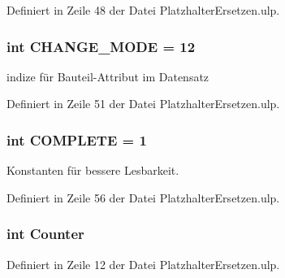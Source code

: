 Definiert in Zeile 48 der Datei Platzhalter\+Ersetzen.\+ulp.

\hypertarget{_platzhalter_ersetzen_8ulp_a3389481e9b966a29fb48e172a5942ddd}{}
\subsubsection[{C\+H\+A\+N\+G\+E\+\_\+\+M\+O\+D\+E}]{\setlength{\rightskip}{0pt plus 5cm}int C\+H\+A\+N\+G\+E\+\_\+\+M\+O\+D\+E = 12}\label{_platzhalter_ersetzen_8ulp_a3389481e9b966a29fb48e172a5942ddd}


indize für Bauteil-\/\+Attribut im Datensatz 



Definiert in Zeile 51 der Datei Platzhalter\+Ersetzen.\+ulp.

\hypertarget{_platzhalter_ersetzen_8ulp_a01030b244f6352425e8de676f9d43288}{}
\subsubsection[{C\+O\+M\+P\+L\+E\+T\+E}]{\setlength{\rightskip}{0pt plus 5cm}int C\+O\+M\+P\+L\+E\+T\+E = 1}\label{_platzhalter_ersetzen_8ulp_a01030b244f6352425e8de676f9d43288}


Konstanten für bessere Lesbarkeit. 



Definiert in Zeile 56 der Datei Platzhalter\+Ersetzen.\+ulp.

\hypertarget{_platzhalter_ersetzen_8ulp_a8da6d6b33b7597f02434fedca1781cbc}{}
\subsubsection[{Counter}]{\setlength{\rightskip}{0pt plus 5cm}int Counter}\label{_platzhalter_ersetzen_8ulp_a8da6d6b33b7597f02434fedca1781cbc}


Definiert in Zeile 12 der Datei Platzhalter\+Ersetzen.\+ulp.


